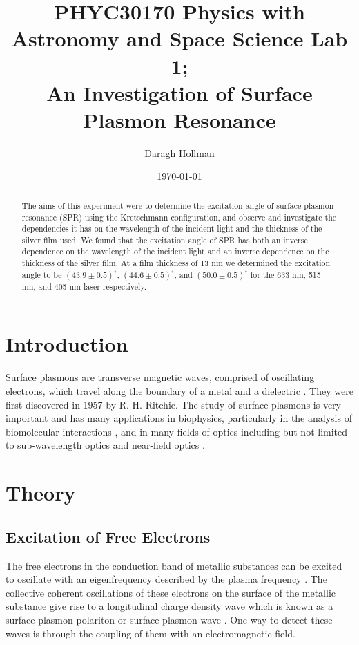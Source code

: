 \documentclass[%
reprint,
amsmath,amssymb,
aps,
]{revtex4-2}
\begin{document}
	
	
	\title{PHYC30170 Physics with Astronomy and Space Science Lab 1;\\An Investigation of Surface Plasmon Resonance}
	
	\author{Daragh Hollman}
	
	\date{\today}
	
	\begin{abstract}
		The aims of this experiment were to determine the excitation angle of surface plasmon resonance (SPR) using the Kretschmann configuration, and observe and investigate the dependencies it has on the wavelength of the incident light and the thickness of the silver film used. We found that the excitation angle of SPR has both an inverse dependence on the wavelength of the incident light and an inverse dependence on the thickness of the silver film.  At a film thickness of 13 nm we determined the excitation angle to be $(43.9\pm0.5)^\circ$, $(44.6\pm0.5)^\circ$, and $(50.0\pm0.5)^\circ$ for the 633 nm, 515 nm, and 405 nm laser respectively.
	\end{abstract}

	\maketitle
	
	\section{Introduction}		
		Surface plasmons are transverse magnetic waves, comprised of oscillating electrons, which travel along the boundary of a metal and a dielectric \cite{undergradToledo}. They were first discovered in 1957 by R. H. Ritchie. The study of surface plasmons is very important and has many applications in biophysics, particularly in the analysis of biomolecular interactions \cite{biomedicalApplications}, and in many fields of optics including but not limited to sub-wavelength optics and near-field optics \cite{opticalApplications}.
	
	\section{Theory}
		\subsection{Excitation of Free Electrons}
			The free electrons in the conduction band of metallic substances can be excited to oscillate with an eigenfrequency described by the plasma frequency \cite{pluchery}. The collective coherent oscillations of these electrons on the surface of the metallic substance give rise to a longitudinal charge density wave which is known as a surface plasmon polariton or surface plasmon wave \cite{pluchery}\cite{zeng}. One way to detect these waves is through the coupling of them with an electromagnetic field.
			
\end{document}
